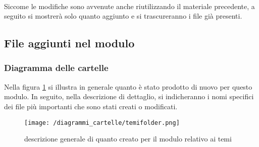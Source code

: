 \paragraph{} Siccome le modifiche sono avvenute anche riutilizzando il materiale precedente, a seguito si mostrerà solo quanto aggiunto e si trascureranno i file già presenti.
\subsection{File aggiunti nel modulo}
\subsubsection{Diagramma delle cartelle}
Nella figura \ref{fig:cartelle-tema} si illustra in generale quanto è stato prodotto di nuovo per questo modulo. In seguito, nella descrizione di dettaglio, si indicheranno i nomi specifici dei file più importanti che sono stati creati o modificati.
\begin{figure}
\centering
\texttt{[image: /diagrammi\_cartelle/temifolder.png]}
\caption{descrizione generale di quanto creato per il modulo relativo ai temi\label{fig:cartelle-tema}}
\end{figure}
\FloatBarrier
